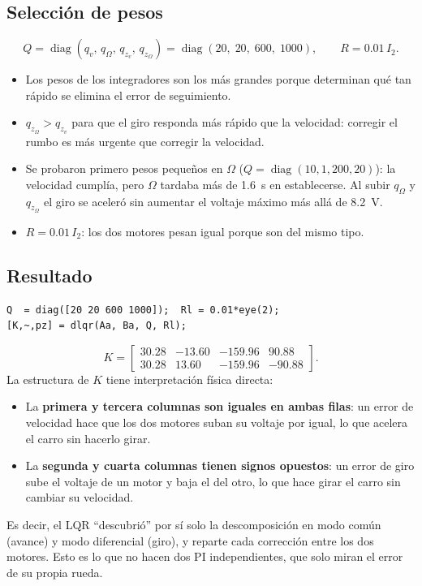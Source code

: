 \documentclass[11pt,letterpaper]{article}
\begin{document}
\subsection{Selección de pesos}
\begin{equation}
  Q = \operatorname{diag}(q_v,\, q_\Omega,\, q_{z_v},\, q_{z_\Omega}) = \operatorname{diag}(20,\; 20,\; 600,\; 1000), \qquad R = 0.01\, I_2 .
\end{equation}
\begin{itemize}
  \item Los pesos de los integradores son los más grandes porque determinan qué tan rápido se elimina el error de seguimiento.
  \item $q_{z_\Omega} > q_{z_v}$ para que el giro responda más rápido que la velocidad: corregir el rumbo es más urgente que corregir la velocidad.
  \item Se probaron primero pesos pequeños en $\Omega$ ($Q=\operatorname{diag}(10,1,200,20)$): la velocidad cumplía, pero $\Omega$ tardaba más de 1.6~s en establecerse. Al subir $q_\Omega$ y $q_{z_\Omega}$ el giro se aceleró sin aumentar el voltaje máximo más allá de 8.2~V.
  \item $R = 0.01\,I_2$: los dos motores pesan igual porque son del mismo tipo.
\end{itemize}

\subsection{Resultado}
\begin{lstlisting}
Q  = diag([20 20 600 1000]);  Rl = 0.01*eye(2);
[K,~,pz] = dlqr(Aa, Ba, Q, Rl);
\end{lstlisting}
\begin{equation}
  K = \left[\begin{array}{cc|cc}
    30.28 & -13.60 & -159.96 & 90.88 \\
    30.28 &  13.60 & -159.96 & -90.88
  \end{array}\right].
\end{equation}
La estructura de $K$ tiene interpretación física directa:
\begin{itemize}
  \item La \textbf{primera y tercera columnas son iguales en ambas filas}: un error de velocidad hace que los dos motores suban su voltaje por igual, lo que acelera el carro sin hacerlo girar.
  \item La \textbf{segunda y cuarta columnas tienen signos opuestos}: un error de giro sube el voltaje de un motor y baja el del otro, lo que hace girar el carro sin cambiar su velocidad.
\end{itemize}
Es decir, el LQR ``descubrió'' por sí solo la descomposición en modo común (avance) y modo diferencial (giro), y reparte cada corrección entre los dos motores. Esto es lo que no hacen dos PI independientes, que solo miran el error de su propia rueda.
\end{document}
